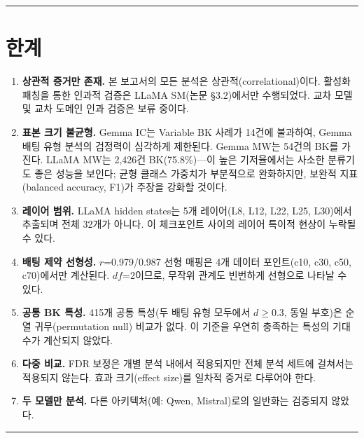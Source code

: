 \documentclass[11pt,a4paper]{article}
\begin{document}
\bigskip\hrule\bigskip

\section{한계}

\begin{enumerate}[leftmargin=2em]
    \item \textbf{상관적 증거만 존재.} 본 보고서의 모든 분석은 상관적(correlational)이다. 활성화 패칭을 통한 인과적 검증은 LLaMA SM(논문 \S3.2)에서만 수행되었다. 교차 모델 및 교차 도메인 인과 검증은 보류 중이다.

    \item \textbf{표본 크기 불균형.} Gemma IC는 Variable BK 사례가 14건에 불과하여, Gemma 배팅 유형 분석의 검정력이 심각하게 제한된다. Gemma MW는 54건의 BK를 가진다. LLaMA MW는 2{,}426건 BK(75.8\%)---이 높은 기저율에서는 사소한 분류기도 좋은 성능을 보인다; 균형 클래스 가중치가 부분적으로 완화하지만, 보완적 지표(balanced accuracy, F1)가 주장을 강화할 것이다.

    \item \textbf{레이어 범위.} LLaMA hidden states는 5개 레이어(L8, L12, L22, L25, L30)에서 추출되며 전체 32개가 아니다. 이 체크포인트 사이의 레이어 특이적 현상이 누락될 수 있다.

    \item \textbf{배팅 제약 선형성.} $r$=0.979/0.987 선형 매핑은 4개 데이터 포인트(c10, c30, c50, c70)에서만 계산된다. $df$=2이므로, 무작위 관계도 빈번하게 선형으로 나타날 수 있다.

    \item \textbf{공통 BK 특성.} 415개 공통 특성(두 배팅 유형 모두에서 $d$$\geq$0.3, 동일 부호)은 순열 귀무(permutation null) 비교가 없다. 이 기준을 우연히 충족하는 특성의 기대 수가 계산되지 않았다.

    \item \textbf{다중 비교.} FDR 보정은 개별 분석 내에서 적용되지만 전체 분석 세트에 걸쳐서는 적용되지 않는다. 효과 크기(effect size)를 일차적 증거로 다루어야 한다.

    \item \textbf{두 모델만 분석.} 다른 아키텍처(예: Qwen, Mistral)로의 일반화는 검증되지 않았다.
\end{enumerate}

\bigskip\hrule\bigskip

\end{document}
